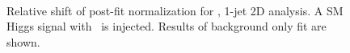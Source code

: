\begin{figure}[!hbtp]
{}
\\
\caption{Relative shift of post-fit normalization for  \GeV, 1-jet 2D analysis.
A SM Higgs signal with  \GeV\ is injected. Results of background only fit are shown.}
\label{fig:norm_inj200_1j_125_bfit}
\end{figure}

